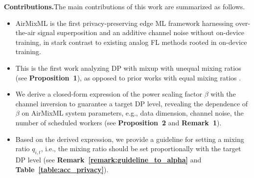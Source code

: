\documentclass[conference,10pt]{IEEEtran}
\theoremstyle{definition}
\theoremstyle{definition}
\begin{document}
\vspace{.2em}\noindent\textbf{Contributions.}\quad The main contributions of this work are
summarized as follows.
\begin{itemize}
	\setlength{\leftskip}{-1em}
	\item AirMixML is the first privacy-preserving edge ML framework harnessing over-the-air signal superposition and an additive channel noise without on-device training, in stark contrast to existing analog FL methods rooted in on-device training\cite{koda2020differentially, liu2020privacyforfree, elgabli2020harnessing}.

	\item This is the first work analyzing DP with mixup with unequal mixing ratios (see \textbf{Proposition~1}), as opposed to prior works with equal mixing ratios \cite{lee2019synthesizing, borgnia2021dp}.

	\item We derive a closed-form expression of the power scaling factor $\beta$ with the channel inversion to guarantee a target DP level, revealing the dependence of $\beta$ on AirMixML system parameters, e.g., data dimension, channel noise, the number of scheduled workers (see \textbf{Proposition~2} and \textbf{Remark~1}).

	\item Based on the derived expression, we provide a guideline for setting a mixing ratio $q_{i, t}$, i.e., the mixing ratio should be set proportionally with the target DP level (see \textbf{Remark~\ref{remark:guideline_to_alpha}} and \textbf{Table~\ref{table:acc_privacy}}).
\end{itemize}
\end{document}
